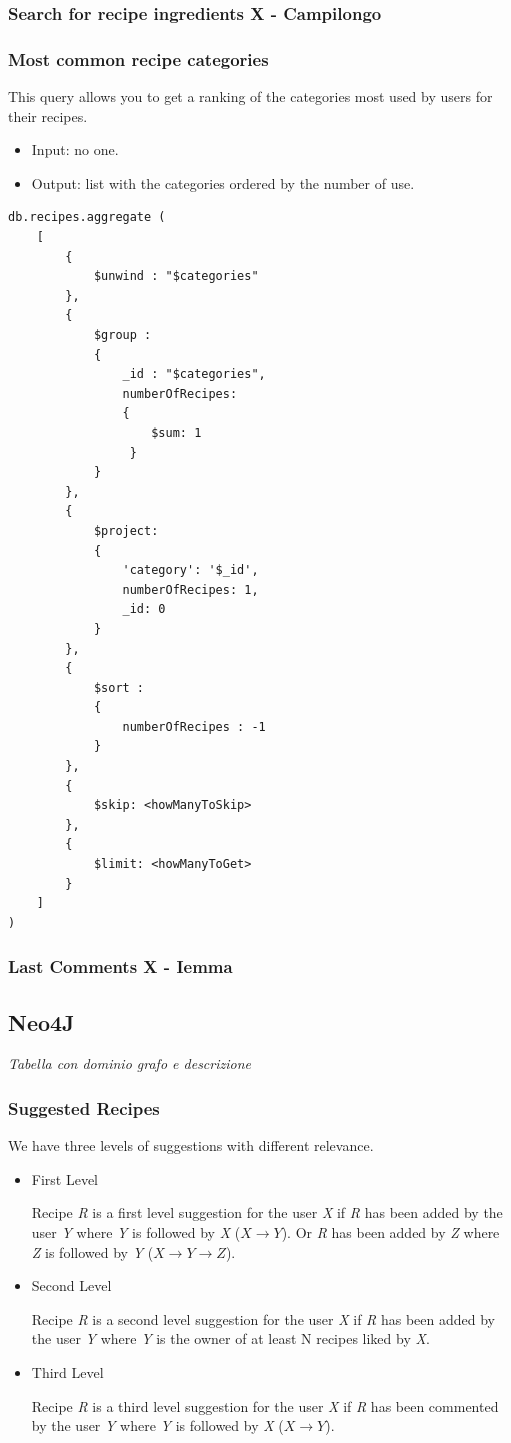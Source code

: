 \documentclass[a4paper]{report}
\begin{document}
\subsubsection{Search for recipe ingredients X -  Campilongo }
\subsubsection{Most common recipe categories}
This query allows you to get a ranking of the categories most used by users for their recipes.
\begin{itemize}
\item Input: no one.
\item Output: list with the categories ordered by the number of use.
\end{itemize}
\lstset{ language=java}
\begin{lstlisting}
db.recipes.aggregate (
	[
		{ 
			$unwind : "$categories" 
		},
		{
			$group :
			{
				_id : "$categories",
			 	numberOfRecipes: 
				{ 
					$sum: 1
				 }
			}
		},
		{
			$project: 
			{
				'category': '$_id',
				numberOfRecipes: 1,
				_id: 0
			}
		},
		{ 
			$sort : 
			{ 
				numberOfRecipes : -1 
			} 
		},
		{ 
			$skip: <howManyToSkip> 
		},
		{ 
			$limit: <howManyToGet> 
		}	
	]
)
\end{lstlisting}
\subsubsection{Last Comments X - Iemma}


\subsection{Neo4J}
\emph{Tabella con dominio grafo e descrizione}
\subsubsection{Suggested Recipes}
We have three levels of suggestions with different relevance.
\begin{itemize}
	\item First Level
	
	\noindent Recipe \emph{R} is a first level suggestion for the user \emph{X} if \emph{R} has been added by the user \emph{Y} where \emph{Y} is followed by \emph{X} ($X \rightarrow Y$). Or \emph{R} has been added by \emph{Z} where \emph{Z} is followed by \emph{Y} ($ X \rightarrow Y \rightarrow Z$).
	
	\item Second Level
	
	\noindent Recipe \emph{R} is a second level suggestion for the user \emph{X} if \emph{R} has been added by the user \emph{Y} where \emph{Y} is the owner of at least N recipes liked by \emph{X}.
	
	\item Third Level
	
	\noindent Recipe \emph{R} is a third level suggestion for the user \emph{X} if \emph{R} has been commented by the user \emph{Y} where \emph{Y} is followed by \emph{X} ($X \rightarrow Y$).
	\noindent 
	
\end{itemize}
\end{document}
